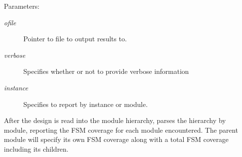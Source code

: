\begin{Desc}
\item[Parameters: ]\par
\begin{description}
\item[{\em 
ofile}]Pointer to file to output results to. \item[{\em 
verbose}]Specifies whether or not to provide verbose information \item[{\em 
instance}]Specifies to report by instance or module.\end{description}
\end{Desc}
After the design is read into the module hierarchy, parses the hierarchy by module, reporting the FSM coverage for each module encountered. The parent module will specify its own FSM coverage along with a total FSM coverage including its  children. 